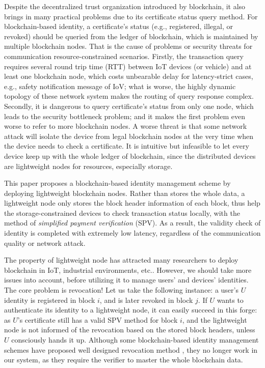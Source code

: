 \documentclass[conference]{IEEEtran}
\begin{document}
Despite the decentralized trust organization introduced by blockchain, it also brings in many practical problems due to its certificate status query method. For blockchain-based identity, a certificate's status (e.g., registered, illegal, or revoked) should be queried from the ledger of blockchain, which is maintained by multiple blockchain nodes. That is the cause of problems or security threats for communication resource-constrained scenarios. Firstly, the transaction query requires several round trip time (RTT) between IoT devices (or vehicle) and at least one blockchain node, which costs unbearable delay for latency-strict cases, e.g., safety notification message of IoV; what is worse, the highly dynamic topology of these network system makes the routing of query response complex. Secondly, it is dangerous to  query certificate's status from only one node, which leads to the security bottleneck problem; and it makes the first problem even worse to refer to more blockchain nodes. A worse threat is that some network attack will isolate the device from legal blockchain nodes at the very time when the device needs to check a certificate. 
It is intuitive but infeasible to let every device keep up with the whole ledger of blockchain, since the distributed devices are lightweight nodes for resources, especially storage. 

This paper proposes a blockchain-based identity management scheme by deploying lightweight blockchain nodes. Rather than stores the whole data, a lightweight node only stores the block header information of each block, thus help the storage-constrained devices to check transaction status locally, with the method of \textit{simplified payment verification} (SPV). As a result, the validity check of identity is completed with extremely low latency, regardless of the communication quality or network attack. 

The property of lightweight node has attracted many researchers to deploy blockchain in IoT, industrial environments, etc.. However, we should take more issues into account, before utilizing it to manage users' and devices' identities. The core problem is revocation! Let us take the following instance: a user's $U$ identity is registered in block $i$, and is later revoked in block $j$. If $U$ wants to authenticate its identity to a lightweight node, it can easily succeed in this forge: as $U$'s certificate still has a valid SPV method for block $i$, and the lightweight node is not informed of the revocation based on the stored block headers, unless $U$ consciously hands it up. Although some blockchain-based identity management schemes have proposed well designed revocation method \cite{luoScalaCertScalabilityOrientedPKI2022a,  wang2020blockchain,jiaRedactableBlockchainDecentralized2022,chenCertchainPublicEfficient2018a}, they no longer work in our system, as they require the verifier to master the whole blockchain data. 
\end{document}
